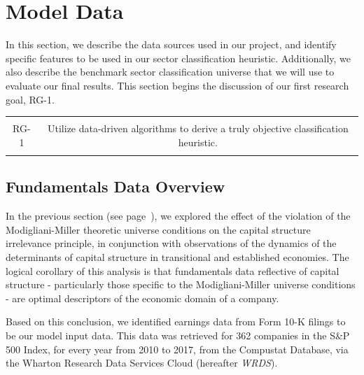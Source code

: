 \documentclass[../main.tex]{subfiles}
\begin{document}
\chapter{Model Data} \label{model_data}

In this section, we describe the data sources used in our project, and identify specific features to be used in our sector classification heuristic. Additionally, we also describe the benchmark sector classification universe that we will use to evaluate our final results. This section begins the discussion of our first research goal, RG-1.
  
 \begin{table}[h!]
    \centering
    \begin{tabular}{| c | c |}
        \hline
        &  \\
        RG-1 & Utilize data-driven algorithms to derive a truly objective classification heuristic. \\
        & \\
        \hline
    \end{tabular}
\end{table}

\section{Fundamentals Data Overview}

In the previous section (see page~\pageref{literature_review:economic_sectors_fundamentals}), we explored the effect of the violation of the Modigliani-Miller theoretic universe conditions on the capital structure irrelevance principle, in conjunction with observations of the dynamics of the determinants of capital structure in transitional and established economies. The logical corollary of this analysis is that fundamentals data reflective of capital structure - particularly those specific to the Modigliani-Miller universe conditions - are optimal descriptors of the economic domain of a company.

Based on this conclusion, we identified earnings data from Form 10-K filings to be our model input data. This data was retrieved for 362 companies in the S\&P 500 Index, for every year from 2010 to 2017, from the Compustat Database, via the Wharton Research Data Services Cloud (hereafter \textit{WRDS}).
\end{document}
